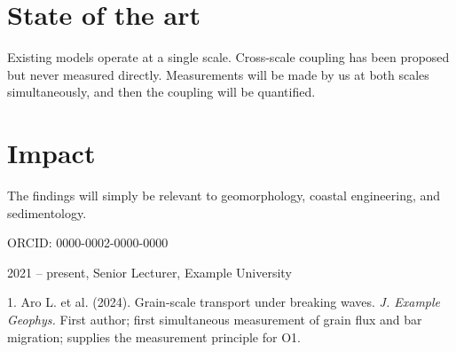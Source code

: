 \documentclass[11pt,a4paper]{article}
\begin{document}
\section{State of the art}
Existing models operate at a single scale. Cross-scale coupling has been proposed but
never measured directly. Measurements will be made by us at both scales
simultaneously, and then the coupling will be quantified.

\section{Impact}
The findings will simply be relevant to geomorphology, coastal engineering, and
sedimentology.

\startsectionb

ORCID: 0000-0002-0000-0000

2021 -- present, Senior Lecturer, Example University

1. Aro L. et al. (2024). Grain-scale transport under breaking waves. \emph{J. Example
Geophys.} First author; first simultaneous measurement of grain flux and bar
migration; supplies the measurement principle for O1.
\end{document}
